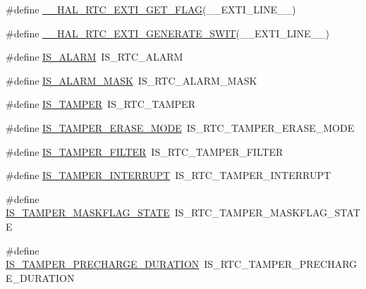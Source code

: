 \begin{DoxyCompactItemize}
\item 
\#define \hyperlink{group___h_a_l___r_t_c___aliased___macros_ga7ff2ab63c65042a0a9ef683d345abf49}{\+\_\+\+\_\+\+H\+A\+L\+\_\+\+R\+T\+C\+\_\+\+E\+X\+T\+I\+\_\+\+G\+E\+T\+\_\+\+F\+L\+AG}(\+\_\+\+\_\+\+E\+X\+T\+I\+\_\+\+L\+I\+N\+E\+\_\+\+\_\+)
\item 
\#define \hyperlink{group___h_a_l___r_t_c___aliased___macros_ga757e6b82b6c280b6a924c0d8ac4bfef7}{\+\_\+\+\_\+\+H\+A\+L\+\_\+\+R\+T\+C\+\_\+\+E\+X\+T\+I\+\_\+\+G\+E\+N\+E\+R\+A\+T\+E\+\_\+\+S\+W\+IT}(\+\_\+\+\_\+\+E\+X\+T\+I\+\_\+\+L\+I\+N\+E\+\_\+\+\_\+)
\item 
\#define \hyperlink{group___h_a_l___r_t_c___aliased___macros_ga7e6a2b69bd0cb85a1d44801ccb116e38}{I\+S\+\_\+\+A\+L\+A\+RM}~I\+S\+\_\+\+R\+T\+C\+\_\+\+A\+L\+A\+RM
\item 
\#define \hyperlink{group___h_a_l___r_t_c___aliased___macros_ga927c5de67a80c6ea175db864959df3e0}{I\+S\+\_\+\+A\+L\+A\+R\+M\+\_\+\+M\+A\+SK}~I\+S\+\_\+\+R\+T\+C\+\_\+\+A\+L\+A\+R\+M\+\_\+\+M\+A\+SK
\item 
\#define \hyperlink{group___h_a_l___r_t_c___aliased___macros_ga720879737ff77db80e800545672cdb72}{I\+S\+\_\+\+T\+A\+M\+P\+ER}~I\+S\+\_\+\+R\+T\+C\+\_\+\+T\+A\+M\+P\+ER
\item 
\#define \hyperlink{group___h_a_l___r_t_c___aliased___macros_ga49cab06ba96add6f8dddac75414b468f}{I\+S\+\_\+\+T\+A\+M\+P\+E\+R\+\_\+\+E\+R\+A\+S\+E\+\_\+\+M\+O\+DE}~I\+S\+\_\+\+R\+T\+C\+\_\+\+T\+A\+M\+P\+E\+R\+\_\+\+E\+R\+A\+S\+E\+\_\+\+M\+O\+DE
\item 
\#define \hyperlink{group___h_a_l___r_t_c___aliased___macros_ga96d532a9a8a0b283f2fd289355001233}{I\+S\+\_\+\+T\+A\+M\+P\+E\+R\+\_\+\+F\+I\+L\+T\+ER}~I\+S\+\_\+\+R\+T\+C\+\_\+\+T\+A\+M\+P\+E\+R\+\_\+\+F\+I\+L\+T\+ER
\item 
\#define \hyperlink{group___h_a_l___r_t_c___aliased___macros_gaa441c6cceeee673784fd5f9dcd1a0334}{I\+S\+\_\+\+T\+A\+M\+P\+E\+R\+\_\+\+I\+N\+T\+E\+R\+R\+U\+PT}~I\+S\+\_\+\+R\+T\+C\+\_\+\+T\+A\+M\+P\+E\+R\+\_\+\+I\+N\+T\+E\+R\+R\+U\+PT
\item 
\#define \hyperlink{group___h_a_l___r_t_c___aliased___macros_ga936b760d07038d51cd9a72f1f0456711}{I\+S\+\_\+\+T\+A\+M\+P\+E\+R\+\_\+\+M\+A\+S\+K\+F\+L\+A\+G\+\_\+\+S\+T\+A\+TE}~I\+S\+\_\+\+R\+T\+C\+\_\+\+T\+A\+M\+P\+E\+R\+\_\+\+M\+A\+S\+K\+F\+L\+A\+G\+\_\+\+S\+T\+A\+TE
\item 
\#define \hyperlink{group___h_a_l___r_t_c___aliased___macros_gacaaf7b6159a85289691dea9b0d3a6195}{I\+S\+\_\+\+T\+A\+M\+P\+E\+R\+\_\+\+P\+R\+E\+C\+H\+A\+R\+G\+E\+\_\+\+D\+U\+R\+A\+T\+I\+ON}~I\+S\+\_\+\+R\+T\+C\+\_\+\+T\+A\+M\+P\+E\+R\+\_\+\+P\+R\+E\+C\+H\+A\+R\+G\+E\+\_\+\+D\+U\+R\+A\+T\+I\+ON

\end{DoxyCompactItemize}
